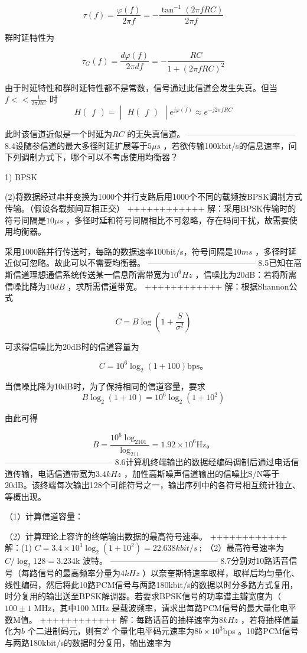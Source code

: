 \documentclass[utf8]{article}
\begin{document}
$$\tau(f)=\frac{\varphi(f)}{2\pi f}=-\frac{\tan^{-1}\left(2\pi fRC\right)}{2\pi f}$$

群时延特性为

$$\tau_G\left(f\right)=\frac{d\varphi\left(f\right)}{2\pi df}=-\frac{RC}{1+\left(2\pi fRC\right)^2}$$

由于时延特性和群时延特性都不是常数，信号通过此信道会发生失真。但当$f<<\frac{1}{2\pi RC}$ 时
$$H\begin{pmatrix}f\end{pmatrix}=\begin{vmatrix}H\begin{pmatrix}f\end{pmatrix}\end{vmatrix}e^{j\varphi(f)}\approx e^{-j2\pi fRC}$$



此时该信道近似是一个时延为$RC$ 的无失真信道。
---------------------------------------
8.4设随参信道的最大多径时延扩展等于$5\mu s$ ，若欲传输100kbit/s的信息速率，问下列调制方式下，哪个可以不考虑使用均衡器？

1) BPSK

(2)将数据经过串并变换为1000个并行支路后用1000个不同的载频按BPSK调制方式传输。（假设各载频间互相正交）
++++++++++++
解：采用BPSK传输时的符号间隔是$10\mu s$ ，多径时延和符号间隔相比不可忽略，存在码间干扰，故需要使用均衡器。

采用1000路并行传送时，每路的数据速率100bit/s，符号间隔是$10ms$ ，多径时延近似可忽略。故此可以不需要均衡器。
---------------------------------------
8.5已知在高斯信道理想通信系统传送某一信息所需带宽为$10^6Hz$ ，信噪比为20dB：若将所需信噪比降为$10dB$ ，求所需信道带宽。
++++++++++++
解：根据Shannon公式

$$C=B\log\left(1+\frac{S}{\sigma^2}\right)$$

可求得信噪比为20dB时的信道容量为

$$C=10^6\log_2\left(1+100\right)\mathrm{bps}。$$

当信噪比降为10dB时，为了保持相同的信道容量，要求
$$B\log_2(1+10)=10^6\log_2(1+10^2)$$

由此可得

$$B=\frac{10^6\log_2101}{\log_211}=1.92\times10^6\text{Hz。}$$
---------------------------------------
8.6计算机终端输出的数据经编码调制后通过电话信道传输，电话信道带宽为$3.4kHz$ ，加性高斯噪声信道输出的信噪比S/N等于20dB。该终端每次输出128个可能符号之一，输出序列中的各符号相互统计独立、等概出现。

（1）计算信道容量：

（2）计算理论上容许的终端输出数据的最高符号速率。
++++++++++++
解：(1) $C=3.4\times10^{3}\log_{2}(1+10^{2})=22.638kbit/s\:;$ 
     （2）最高符号速率为$C/\log_{2}128=3.234$k 波特。
---------------------------------------
8.7分别对10路话音信号（每路信号的最高频率分量为$4kHz$ ）以奈奎斯特速率取样，取样后均匀量化、线性编码，然后将此10路PCM信号与两路180kbit/s的数据以时分多路方式复用，时分复用的输出送至BPSK解调器。若要求BPSK信号的功率谱主瓣宽度为（ $100\pm1$ MHz，其中100 MHz 是载波频率，请求出每路PCM信号的最大量化电平数M值。
++++++++++++
解：每路话音的抽样速率为$8kHz$ ，若将抽样值量化为$b$ 个二进制码元，则有$2^b$ 个量化电平码元速率为$8b\times10^3$bps 。10路PCM信号与两路180kbit/s的数据时分复用，输出速率为
\end{document}
